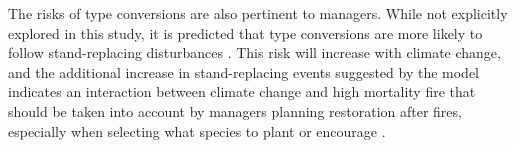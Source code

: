 \documentclass[12pt]{article}
\begin{document}
\begin{spacing}{1}
The risks of type conversions are also pertinent to managers. While not explicitly explored in this study, it is predicted that type conversions are more likely to follow stand-replacing disturbances \citep{Stephens2013}. This risk will increase with climate change, and the additional increase in stand-replacing events suggested by the model indicates an interaction between climate change and high mortality fire that should be taken into account by managers planning restoration after fires, especially when selecting what species to plant or encourage \citep{Fule2008,Schwartz2015}.




\end{spacing}
\end{document}
